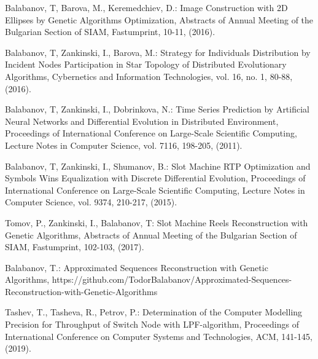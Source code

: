 \documentclass[11pt]{article}
\begin{document}
\begin{thebibliography}{99}
 Balabanov, T, Barova, M., Keremedchiev, D.: Image Construction with 2D Ellipses by Genetic Algorithms Optimization, Abstracts of Annual Meeting of the Bulgarian Section of SIAM, Fastumprint, 10-11, (2016).

 Balabanov, T, Zankinski, I., Barova, M.: Strategy for Individuals Distribution by Incident Nodes Participation in Star Topology of Distributed Evolutionary Algorithms, Cybernetics and Information Technologies, vol. 16, no. 1, 80-88, (2016).

 Balabanov, T, Zankinski, I., Dobrinkova, N.: Time Series Prediction by Artificial Neural Networks and Differential Evolution in Distributed Environment, Proceedings of International Conference on Large-Scale Scientific Computing, Lecture Notes in Computer Science, vol. 7116, 198-205, (2011).

 Balabanov, T, Zankinski, I., Shumanov, B.: Slot Machine RTP Optimization and Symbols Wins Equalization with Discrete Differential Evolution, Proceedings of International Conference on Large-Scale Scientific Computing, Lecture Notes in Computer Science, vol. 9374, 210-217, (2015).

 Tomov, P., Zankinski, I., Balabanov, T: Slot Machine Reels Reconstruction with Genetic Algorithms, Abstracts of Annual Meeting of the Bulgarian Section of SIAM, Fastumprint, 102-103, (2017).

 Balabanov, T.: Approximated Sequences Reconstruction with Genetic Algorithms, https://github.com/TodorBalabanov/Approximated-Sequences-Reconstruction-with-Genetic-Algorithms

 Tashev, T., Tasheva, R., Petrov, P.: Determination of the Computer Modelling Precision for Throughput of Switch Node with LPF-algorithm, Proceedings of  International Conference on Computer Systems and Technologies, ACM, 141-145, (2019).

\end{thebibliography}
\end{document}
